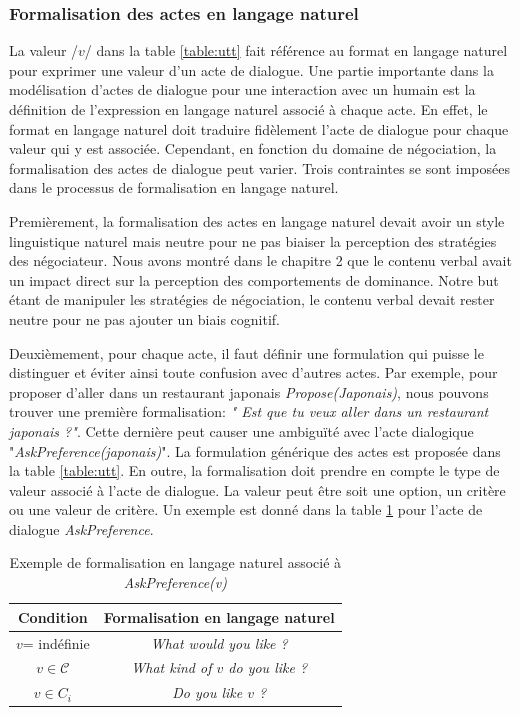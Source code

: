 \subsubsection{Formalisation des actes en langage naturel}
\label{sec:formalisation}
La valeur /$v$/ dans la table \ref{table:utt} fait référence au format en langage naturel pour exprimer une valeur d'un acte de dialogue.
Une partie importante dans la modélisation d'actes de dialogue pour une interaction avec un humain est la définition de l'expression en langage naturel associé à chaque acte. En effet, le format en langage naturel doit traduire fidèlement l'acte de dialogue pour chaque valeur qui y est associée.
Cependant, en fonction du domaine de négociation, la formalisation des actes de dialogue peut varier. Trois contraintes se sont imposées dans le processus de formalisation en langage naturel. 

Premièrement, la formalisation des actes en langage naturel devait avoir un style linguistique naturel mais neutre pour ne pas biaiser la perception des stratégies des négociateur. Nous avons montré dans le chapitre 2 que le contenu verbal avait un impact direct sur la perception des comportements de dominance. 
Notre but étant de manipuler les stratégies de négociation, le contenu verbal devait rester neutre pour ne pas ajouter un biais cognitif.

Deuxièmement, pour chaque acte, il faut définir une formulation qui puisse le distinguer et éviter ainsi toute confusion avec d'autres actes. Par exemple, pour proposer d'aller dans un restaurant japonais \emph{Propose(Japonais)}, nous pouvons trouver une première formalisation: \emph{" Est que tu veux aller dans un restaurant japonais ?"}. Cette dernière peut causer une ambiguïté avec l'acte dialogique "\textit{AskPreference(japonais)}". 
La formulation générique des actes est proposée dans la table \ref{table:utt}. En outre, la formalisation doit prendre en compte le type de valeur associé à l'acte de dialogue. La valeur peut être soit une option, un critère ou une valeur de critère. Un exemple est donné dans la table \ref{tab:askEx} pour l'acte de dialogue \emph{AskPreference}. 


\begin{table} [h]
	\begin{tabular} {c c}
		\hline
		\hline
		\textbf{Condition} &\textbf{ Formalisation en langage naturel }\\
		\hline
		$v$= indéfinie & \textit{What would you like ?} \\
		\hline
		$v \in \mathcal{C}$ & \textit{What kind of $v$ do you like ?} \\
		\hline
		$ v \in C_i $ & \textit{Do you like $v$ ?} \\
		\hline
		\hline
		
	\end{tabular}
	\caption{\label{tab:askEx} Exemple de formalisation en langage naturel associé à \emph{AskPreference(v)}}
\end{table}

